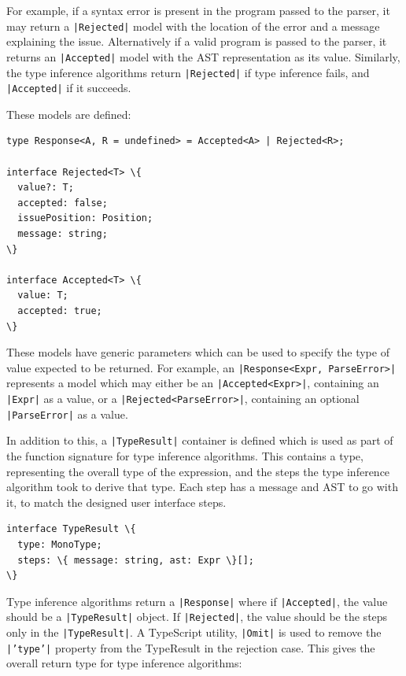 \documentclass[a4paper,fleqn,oneside,12pt]{report}
\begin{document}
For example, if a syntax error is present in the program passed to the parser, it may return a \texttt{|Rejected|} model with the location of the error and a message explaining the issue. Alternatively if a valid program is passed to the parser, it returns an \texttt{|Accepted|} model with the AST representation as its value. Similarly, the type inference algorithms return \texttt{|Rejected|} if type inference fails, and \texttt{|Accepted|} if it succeeds.

These models are defined:

\begin{verbatim}
type Response<A, R = undefined> = Accepted<A> | Rejected<R>;

interface Rejected<T> \{
  value?: T;
  accepted: false;
  issuePosition: Position;
  message: string;
\}

interface Accepted<T> \{
  value: T;
  accepted: true;
\}
\end{verbatim}

These models have generic parameters which can be used to specify the type of value expected to be returned. For example, an \texttt{|Response<Expr, ParseError>|} represents a model which may either be an \texttt{|Accepted<Expr>|}, containing an \texttt{|Expr|} as a value, or a \texttt{|Rejected<ParseError>|}, containing an optional \texttt{|ParseError|} as a value.

In addition to this, a \texttt{|TypeResult|} container is defined which is used as part of the function signature for type inference algorithms. This contains a type, representing the overall type of the expression, and the steps the type inference algorithm took to derive that type. Each step has a message and AST to go with it, to match the designed user interface steps.

\begin{verbatim}
interface TypeResult \{
  type: MonoType;
  steps: \{ message: string, ast: Expr \}[];
\}
\end{verbatim}

Type inference algorithms return a \texttt{|Response|} where if \texttt{|Accepted|}, the value should be a \texttt{|TypeResult|} object. If \texttt{|Rejected|}, the value should be the steps only in the \texttt{|TypeResult|}. A TypeScript utility, \texttt{|Omit|} is used to remove the \texttt{|’type’|} property from the TypeResult in the rejection case. This gives the overall return type for type inference algorithms:
\end{document}

